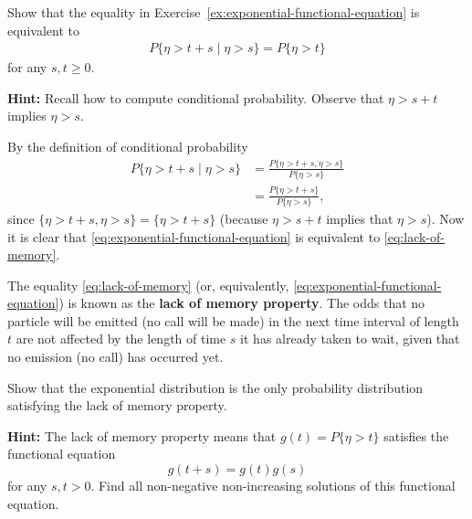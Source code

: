 \begin{Exercise}
\label{ex:lack-of-memory-equivalent}
Show that the equality in Exercise~\ref{ex:exponential-functional-equation} is equivalent to
\begin{align}
P\{\eta > t + s \mid \eta > s\} = P\{\eta > t\} \tag{6.2}
\label{eq:lack-of-memory}
\end{align}
for any $s, t \geq 0$.

\noindent\textbf{Hint:} Recall how to compute conditional probability. Observe that $\eta > s + t$ implies $\eta > s$.
\end{Exercise}

\begin{Solution}
By the definition of conditional probability
\begin{equation}
\begin{aligned}
P\{\eta > t + s \mid \eta > s\} &= \frac{P\{\eta > t + s, \eta > s\}}{P\{\eta > s\}} \\
&= \frac{P\{\eta > t + s\}}{P\{\eta > s\}},
\end{aligned}
\end{equation}
since $\{\eta > t + s, \eta > s\} = \{\eta > t + s\}$ (because $\eta > s + t$ implies that $\eta > s$). Now it is clear that \cref{eq:exponential-functional-equation} is equivalent to \cref{eq:lack-of-memory}.
\end{Solution}

The equality \cref{eq:lack-of-memory} (or, equivalently, \cref{eq:exponential-functional-equation}) is known as the \textbf{lack of memory property}. The odds that no particle will be emitted (no call will be made) in the next time interval of length $t$ are not affected by the length of time $s$ it has already taken to wait, given that no emission (no call) has occurred yet.

\begin{Exercise}
\label{ex:exponential-unique-lack-of-memory}
Show that the exponential distribution is the only probability distribution satisfying the lack of memory property.

\noindent\textbf{Hint:} The lack of memory property means that $g(t) = P\{\eta > t\}$ satisfies the functional equation
\[
g(t + s) = g(t) g(s)
\]
for any $s, t > 0$. Find all non-negative non-increasing solutions of this functional equation.
\end{Exercise}

